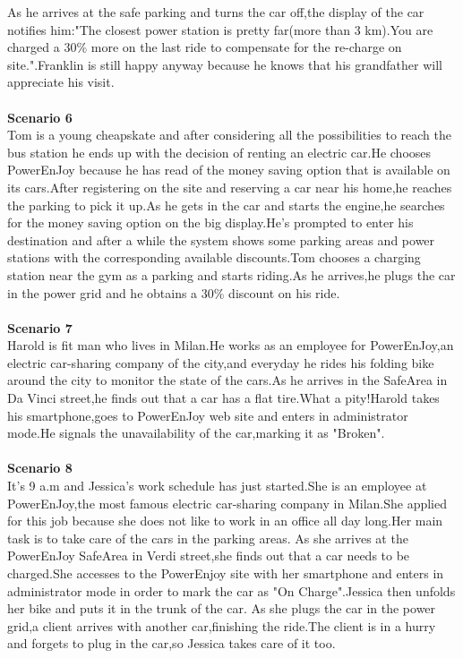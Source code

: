 \documentclass[11pt,a4paper]{report}
\begin{document}
As he arrives at the safe parking and turns the car off,the display of the car notifies him:"The closest power station is pretty far(more than 3 km).You are charged a 30\% more on the last ride to compensate for the re-charge on site.".Franklin is still happy anyway because he knows that his grandfather will appreciate his visit.\\ 
\noindent \\
\textbf{Scenario 6}\\
Tom is a young cheapskate and after considering all the possibilities to reach the bus station he ends up with the decision of renting an electric car.He chooses PowerEnJoy because he has read of the money saving option that is available on its cars.After registering on the site and reserving a car near his home,he reaches the parking to pick it up.As he gets in the car and starts the engine,he searches for the money saving option on the big display.He's prompted to enter his destination and after a while the system shows some parking areas and power stations with the corresponding available discounts.Tom chooses a charging station near the gym as a parking and starts riding.As he arrives,he plugs the car in the power grid and he obtains a 30\% discount on his ride.\\
\noindent \\
\textbf{Scenario 7}\\ 
Harold is fit man who lives in Milan.He works as an employee for PowerEnJoy,an electric car-sharing company of the city,and everyday he rides his folding bike around the city to monitor the state of the cars.As he arrives in the SafeArea in Da Vinci street,he finds out  that a car has a flat tire.What a pity!Harold takes his smartphone,goes to PowerEnJoy web site and enters in administrator mode.He signals the unavailability of the car,marking it as "Broken".\\
\noindent \\
\textbf{Scenario 8}\\
It's 9 a.m and Jessica's work schedule has just started.She is an employee at PowerEnJoy,the most famous electric car-sharing company in Milan.She applied for this job because she does not like to work in an office all day long.Her main task is to take care of the cars in the parking areas.
As she arrives at the PowerEnJoy SafeArea in Verdi street,she finds out that a car needs to be charged.She accesses to the PowerEnjoy site with her smartphone and enters in administrator mode in order to mark the car as "On Charge".Jessica then unfolds her bike and puts it in the trunk of the car.
As she plugs the car in the power grid,a client arrives with another car,finishing the ride.The client is in a hurry and forgets to plug in the car,so Jessica takes care of it too.
\\
\end{document}
